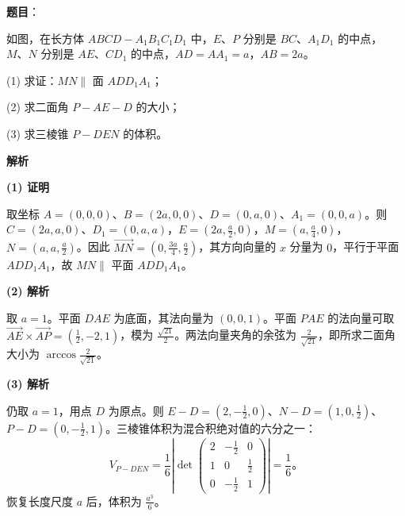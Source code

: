 \begin{answer}

\textbf{题目}：

如图，在长方体 $ABCD-A_1B_1C_1D_1$ 中，$E\text{、}P$ 分别是 $BC\text{、}A_1D_1$ 的中点，$M\text{、}N$ 分别是 $AE\text{、}CD_1$ 的中点，$AD=AA_1=a$，$AB=2a$。

(1) 求证：$MN\parallel$ 面 $ADD_1A_1$；

(2) 求二面角 $P-AE-D$ 的大小；

(3) 求三棱锥 $P-DEN$ 的体积。
\nopagebreak[4]
\begin{center}\end{center}
\nopagebreak[4]
\textbf{解析}

\textbf{(1) 证明}

取坐标 $A=(0,0,0)\text{、}B=(2a,0,0)\text{、}D=(0,a,0)\text{、}A_1=(0,0,a)$。则 $C=(2a,a,0)\text{、}D_1=(0,a,a)$，$E=(2a,\frac a2,0)$，$M=(a,\frac a4,0)$，$N=(a,a,\frac a2)$。因此 $\overrightarrow{MN}=(0,\frac{3a}4,\frac a2)$，其方向向量的 $x$ 分量为 $0$，平行于平面 $ADD_1A_1$，故 $MN\parallel$ 平面 $ADD_1A_1$。

\textbf{(2) 解析}

取 $a=1$。平面 $DAE$ 为底面，其法向量为 $(0,0,1)$。平面 $PAE$ 的法向量可取 $\overrightarrow{AE}\times\overrightarrow{AP}=(\frac12,-2,1)$，模为 $\frac{\sqrt{21}}2$。两法向量夹角的余弦为 $\frac2{\sqrt{21}}$，即所求二面角大小为 $\arccos\frac2{\sqrt{21}}$。

\textbf{(3) 解析}

仍取 $a=1$，用点 $D$ 为原点。则 $E-D=(2,-\frac12,0)$、$N-D=(1,0,\frac12)$、$P-D=(0,-\frac12,1)$。三棱锥体积为混合积绝对值的六分之一：
\nopagebreak[4]
\[
V_{P-DEN}=\frac16\left|\det\begin{pmatrix}2&-\frac12&0\\1&0&\frac12\\0&-\frac12&1\end{pmatrix}\right|=\frac16\mbox{。}
\]
恢复长度尺度 $a$ 后，体积为 $\frac{a^3}{6}$。




\end{answer}
